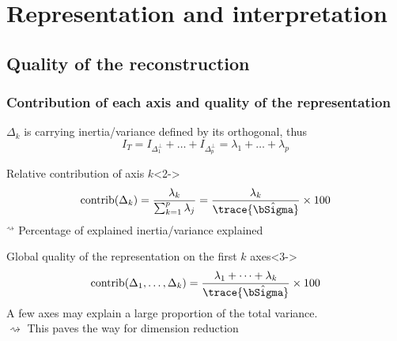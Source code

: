 \documentclass{beamer}\usepackage[]{graphicx}\usepackage[]{color}
\begin{document}

\section{Representation and interpretation}

\subsection{Quality of the reconstruction}

\begin{frame}
  \frametitle{Contribution of each axis and quality of the representation}
  
  $\Delta_k$ is carrying inertia/variance defined by its orthogonal, thus 
  \begin{equation*}
      I_T = I_{\Delta_1^\bot} + \dots + I_{\Delta_p^\bot} = \lambda_1 + \dots + \lambda_p
  \end{equation*}

  \begin{block}{Relative contribution of axis $k$}<2->
    \vspace{-.5cm}
  \[ 
    \mathrm{contrib}(\Delta_k) = \frac{\lambda_k}{\sum_{k=1}^p\lambda_j} = \frac{\lambda_k}{\trace{\hat\bSigma}} \times 100 
  \]
    $^\rightsquigarrow$ \alert{Percentage of explained inertia/variance explained}
  \end{block}

  \begin{block}{Global quality of the representation on the first $k$ axes}<3->
    \vspace{-.5cm}
  \[ 
    \mathrm{contrib}(\Delta_1,\dots,\Delta_k) = \frac{\lambda_1 + \dots + \lambda_k}{\trace{\hat\bSigma}}  \times 100 
  \]
    A few axes may explain a large proportion of the total variance.\\
    $\rightsquigarrow$ \alert{This paves the way for dimension reduction} 
  \end{block}
  
\end{frame}
\end{document}

